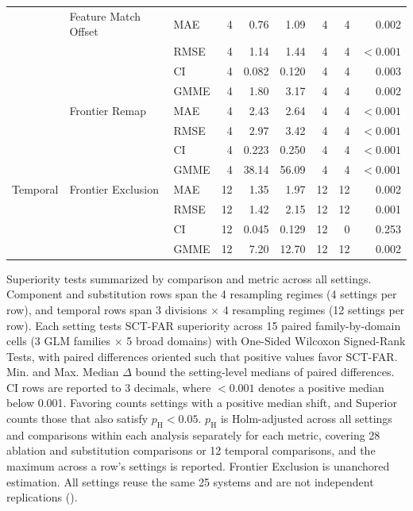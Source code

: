\documentclass{article}
\begin{document}
\begin{table}[H]
\begin{tabularx}{\linewidth}{@{}l>{\raggedright\arraybackslash}Xlrrrrrr@{}}
\addlinespace
 & Feature Match Offset & MAE & 4 & 0.76 & 1.09 & 4 & 4 & 0.002 \\
 & & RMSE & 4 & 1.14 & 1.44 & 4 & 4 & $<0.001$ \\
 & & CI & 4 & 0.082 & 0.120 & 4 & 4 & 0.003 \\
 & & GMME & 4 & 1.80 & 3.17 & 4 & 4 & 0.002 \\
\addlinespace
 & Frontier Remap & MAE & 4 & 2.43 & 2.64 & 4 & 4 & $<0.001$ \\
 & & RMSE & 4 & 2.97 & 3.42 & 4 & 4 & $<0.001$ \\
 & & CI & 4 & 0.223 & 0.250 & 4 & 4 & $<0.001$ \\
 & & GMME & 4 & 38.14 & 56.09 & 4 & 4 & $<0.001$ \\
\addlinespace
Temporal & Frontier Exclusion & MAE & 12 & 1.35 & 1.97 & 12 & 12 & 0.002 \\
 & & RMSE & 12 & 1.42 & 2.15 & 12 & 12 & 0.001 \\
 & & CI & 12 & 0.045 & 0.129 & 12 & 0 & 0.253 \\
 & & GMME & 12 & 7.20 & 12.70 & 12 & 12 & 0.002 \\
\bottomrule
\end{tabularx}
\par\vspace{12pt}
\begin{minipage}{\linewidth}
\footnotesize
Superiority tests summarized by comparison and metric across all settings. Component and substitution rows span the 4 resampling regimes (4 settings per row), and temporal rows span 3 divisions $\times$ 4 resampling regimes (12 settings per row). Each setting tests SCT-FAR superiority across 15 paired family-by-domain cells (3 GLM families $\times$ 5 broad domains) with One-Sided Wilcoxon Signed-Rank Tests, with paired differences oriented such that positive values favor SCT-FAR. Min. and Max. Median $\Delta$ bound the setting-level medians of paired differences. CI rows are reported to 3 decimals, where $<0.001$ denotes a positive median below 0.001. Favoring counts settings with a positive median shift, and Superior counts those that also satisfy $p_{\mathrm H}<0.05$. $p_{\mathrm H}$ is Holm-adjusted across all settings and comparisons within each analysis separately for each metric, covering 28 ablation and substitution comparisons or 12 temporal comparisons, and the maximum across a row's settings is reported. Frontier Exclusion is unanchored estimation. All settings reuse the same 25 systems and are not independent replications ().
\end{minipage}
\end{table}
\end{document}
